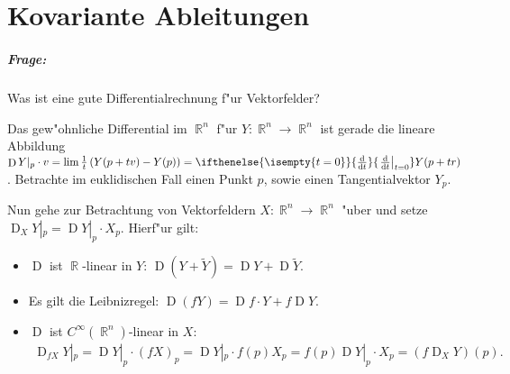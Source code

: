 \documentclass[paper=A4, twoside, chapterprefix=true, bibliography=totoc, headsepline]{scrbook}
\DeclareMathOperator{\R}{\mathbb{R}}
\DeclareMathOperator{\D}{D}         %
\newcommand{\dop}{\mathrm{d}}
\newcommand{\difffrac}[3][]{\ifthenelse{\isempty{#1}}{\frac{\dop #2}{\dop #3}}{\left. \frac{\dop #2}{\dop #3} \right|_{#1}}}
\theoremstyle{plain}
\theoremstyle{nonumberplain}
\theoremstyle{empty}
\theoremstyle{break}
\newcommand{\quot}[1]{\textrm{\glqq}{#1}\textrm{\grqq}}
\begin{document}



\chapter{Kovariante Ableitungen}

\paragraph{Frage:} Was ist eine \quot{gute} Differentialrechnung f"ur Vektorfelder?

Das gew"ohnliche Differential im $\R^n$ f"ur $Y \colon \R^n \to \R^n$ ist gerade die lineare Abbildung $\D Y|_p \cdot v = \lim \frac{1}t \left(Y(p+tv) -Y(p)\right) = \difffrac[t=0]{}{t} Y(p+tr)$.
Betrachte im euklidischen Fall einen Punkt $p$, sowie einen Tangentialvektor $Y_p$.
\begin{center}\end{center}

Nun gehe zur Betrachtung von Vektorfeldern $X \colon \R^n \to \R^n$ "uber und setze $\D_XY|_p = \D Y|_p\cdot X_p$. Hierf"ur gilt:
\begin{itemize}
\item $\D$ ist $\R$-linear in $Y$: $\D(Y + \tilde Y) = \D Y + \D \tilde Y$.
\item Es gilt die Leibnizregel: $\D(fY) = \D f \cdot Y + f\D Y$.
\item $\D$ ist $C^{\infty}(\R^n)$-linear in $X$:
  \begin{align*}
    \D_{fX}Y|_p = \D Y|_p\cdot(fX)_p = \D Y|_p \cdot f(p)X_p = f(p) \D Y|_p \cdot X_p = (f \D_XY)(p).
  \end{align*}
\end{itemize}
\end{document}
